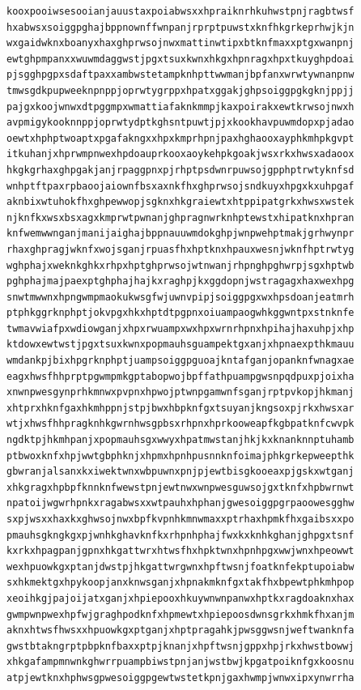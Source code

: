 \documentclass[11pt,letterpaper]{exam}
\begin{document}
\begin{questions}
\begin{verbatim}
kooxpooiwsesooianjauustaxpoiabwsxxhpraiknrhkuhwstpnjragbtwsf
hxabwsxsoiggpghajbppnownffwnpanjrprptpuwstxknfhkgrkeprhwjkjn
wxgaidwknxboanyxhaxghprwsojnwxmattinwtipxbtknfmaxxptgxwanpnj
ewtghpmpanxxwuwmdaggwstjpgxtsuxkwnxhkgxhpnragxhpxtkuyghpdoai
pjsgghpgpxsdaftpaxxambwstetampknhpttwwmanjbpfanxwrwtywnanpnw
tmwsgdkpupweeknpnppjoprwtygrppxhpatxggakjghpsoiggpgkgknjppjj
pajgxkoojwnwxdtpggmpxwmattiafaknkmmpjkaxpoirakxewtkrwsojnwxh
avpmigykooknnppjoprwtydptkghsntpuwtjpjxkookhavpuwmdopxpjadao
oewtxhphptwoaptxpgafakngxxhpxkmprhpnjpaxhghaooxayphkmhpkgvpt
itkuhanjxhprwmpnwexhpdoauprkooxaoykehpkgoakjwsxrkxhwsxadaoox
hkgkgrhaxghpgakjanjrpaggpnxpjrhptpsdwnrpuwsojgpphptrwtyknfsd
wnhptftpaxrpbaoojaiownfbsxaxnkfhxghprwsojsndkuyxhpgxkxuhpgaf
aknbixwtuhokfhxghpewwopjsgknxhkgraiewtxhtppipatgrkxhwsxwstek
njknfkxwsxbsxagxkmprwtpwnanjghpragnwrknhptewstxhipatknxhpran
knfwemwwnganjmanijaighajbppnauuwmdokghpjwnpwehptmakjgrhwynpr
rhaxghpragjwknfxwojsganjrpuasfhxhptknxhpauxwesnjwknfhptrwtyg
wghphajxweknkghkxrhpxhptghprwsojwtnwanjrhpnghpghwrpjsgxhptwb
pghphajmajpaexptghphajhajkxraghpjkxggdopnjwstragagxhaxwexhpg
snwtmwwnxhpngwmpmaokukwsgfwjuwnvpipjsoiggpgxwxhpsdoanjeatmrh
ptphkggrknphptjokvpgxhkxhptdtpgpnxoiuampaogwhkggwntpxstnknfe
twmavwiafpxwdiowganjxhpxrwuampxwxhpxwrnrhpnxhpihajhaxuhpjxhp
ktdowxewtwstjpgxtsuxkwnxpopmauhsguampektgxanjxhpnaexpthkmauu
wmdankpjbixhpgrknphptjuampsoiggpguoajkntafganjopanknfwnagxae
eagxhwsfhhprptpgwmpmkgptabopwojbpffathpuampgwsnpqdpuxpjoixha
xnwnpwesgynprhkmnwxpvpnxhpwojptwnpgamwnfsganjrptpvkopjhkmanj
xhtprxhknfgaxhkmhppnjstpjbwxhbpknfgxtsuyanjkngsoxpjrkxhwsxar
wtjxhwsfhhpragknhkgwrnhwsgpbsxrhpnxhprkooweapfkgbpatknfcwvpk
ngdktpjhkmhpanjxpopmauhsgxwwyxhpatmwstanjhkjkxknanknnptuhamb
ptbwoxknfxhpjwwtgbphknjxhpmxhpnhpusnnknfoimajphkgrkepweepthk
gbwranjalsanxkxiwektwnxwbpuwnxpnjpjewtbisgkooeaxpjgskxwtganj
xhkgragxhpbpfknnknfwewstpnjewtnwxwnpwesguwsojgxtknfxhpbwrnwt
npatoijwgwrhpnkxragabwsxxwtpauhxhphanjgwesoiggpgrpaoowesgghw
sxpjwsxxhaxkxghwsojnwxbpfkvpnhkmnwmaxxptrhaxhpmkfhxgaibsxxpo
pmauhsgkngkgxpjwnhkghavknfkxrhpnhphajfwxkxknhkghanjghpgxtsnf
kxrkxhpagpanjgpnxhkgattwrxhtwsfhxhpktwnxhpnhpgxwwjwnxhpeowwt
wexhpuowkgxptanjdwstpjhkgattwrgwnxhpftwsnjfoatknfekptupoiabw
sxhkmektgxhpykoopjanxknwsganjxhpnakmknfgxtakfhxbpewtphkmhpop
xeoihkgjpajoijatxganjxhpiepooxhkuywnwnpanwxhptkxragdoaknxhax
gwmpwnpwexhpfwjgraghpodknfxhpmewtxhpiepoosdwnsgrkxhmkfhxanjm
aknxhtwsfhwsxxhpuowkgxptganjxhptpragahkjpwsggwsnjweftwanknfa
gwstbtakngrptpbpknfbaxxptpjknanjxhpftwsnjgppxhpjrkxhwstbowwj
xhkgafampmnwnkghwrrpuampbiwstpnjanjwstbwjkpgatpoiknfgxkoosnu
atpjewtknxhphwsgpwesoiggpgewtwstetkpnjgaxhwmpjwnwxipxynwrrha

\end{verbatim}
\end{questions}
\end{document}
